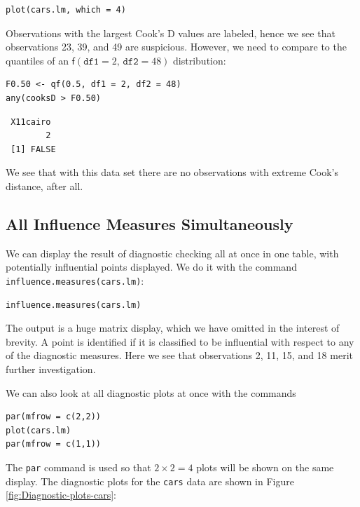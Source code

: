\documentclass[captions=tableheading]{scrbook}
\begin{document}
\begin{verbatim}
plot(cars.lm, which = 4)
\end{verbatim}





Observations with the largest Cook's D values are labeled, hence we see that observations 23, 39, and 49 are suspicious. However, we need to compare to the quantiles of an \( \mathsf{f}(\mathtt{df1} = 2, \, \mathtt{df2} = 48) \) distribution:


\begin{verbatim}
F0.50 <- qf(0.5, df1 = 2, df2 = 48)
any(cooksD > F0.50)
\end{verbatim}

\begin{verbatim}
 X11cairo 
        2
 [1] FALSE
\end{verbatim}

We see that with this data set there are no observations with extreme Cook's distance, after all.
\subsection{All Influence Measures Simultaneously}
\label{sec-11-5-5}


We can display the result of diagnostic checking all at once in one table, with potentially influential points displayed. We do it with the command \texttt{influence.measures(cars.lm)}:


\begin{verbatim}
influence.measures(cars.lm)
\end{verbatim}

The output is a huge matrix display, which we have omitted in the interest of brevity. A point is identified if it is classified to be influential with respect to any of the diagnostic measures. Here we see that observations 2, 11, 15, and 18 merit further investigation.  

We can also look at all diagnostic plots at once with the commands


\begin{verbatim}
par(mfrow = c(2,2))
plot(cars.lm)
par(mfrow = c(1,1))
\end{verbatim}

The \texttt{par} command is used so that \(2\times 2 = 4\) plots will be shown on the same display. The diagnostic plots for the \texttt{cars} data are shown in Figure \ref{fig:Diagnostic-plots-cars}:
\end{document}
